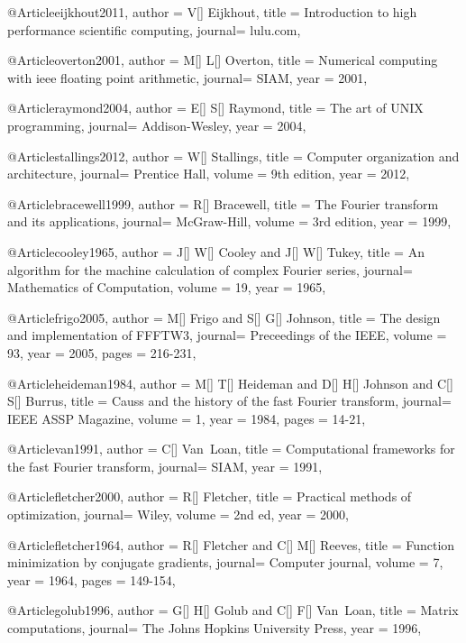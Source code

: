 {@Article{eijkhout2011,
  author = 	 {V[] Eijkhout},
  title  = 	 {Introduction to high performance scientific computing},
  journal= 	 {lulu.com},
}

@Article{overton2001,
  author = 	 {M[] L[] Overton},
  title  = 	 {Numerical computing with ieee floating point arithmetic},
  journal= 	 {SIAM},
  year   = 	 2001,
}

@Article{raymond2004,
  author = 	 {E[] S[] Raymond},
  title  = 	 {The art of UNIX programming},
  journal= 	 {Addison-Wesley},
  year   = 	 2004,
}

@Article{stallings2012,
  author = 	 {W[] Stallings},
  title  = 	 {Computer organization and architecture},
  journal= 	 {Prentice Hall},
  volume =	 {9th edition},
  year   = 	 2012,
}

@Article{bracewell1999,
  author = 	 {R[] Bracewell},
  title  = 	 {The Fourier transform and its applications},
  journal= 	 {McGraw-Hill},
  volume =	 {3rd edition},
  year   = 	 1999,
}

@Article{cooley1965,
  author = 	 {J[] W[] Cooley and J[] W[] Tukey},
  title  = 	 {An algorithm for the machine calculation of complex Fourier series},
  journal= 	 {Mathematics of Computation},
  volume =	 {19},
  year   = 	 1965,
}

@Article{frigo2005,
  author = 	 {M[] Frigo and S[] G[] Johnson},
  title  = 	 {The design and implementation of FFFTW3},
  journal= 	 {Preceedings of the IEEE},
  volume =	 {93},
  year   = 	 2005,
  pages = 216-231,
}

@Article{heideman1984,
  author = 	 {M[] T[] Heideman and D[] H[] Johnson and C[] S[] Burrus},
  title  = 	 {Causs and the history of the fast Fourier transform},
  journal= 	 {IEEE ASSP Magazine},
  volume =	 {1},
  year   = 	 1984,
  pages = 14-21,
}

@Article{van1991,
  author = 	 {C[] Van~Loan},
  title  = 	 {Computational frameworks for the fast Fourier transform},
  journal= 	 {SIAM},
  year   = 	 1991,
}

@Article{fletcher2000,
  author = 	 {R[] Fletcher},
  title  = 	 {Practical methods of optimization},
  journal= 	 {Wiley},
  volume =	 {2nd ed},
  year   = 	 2000,
}

@Article{fletcher1964,
  author = 	 {R[] Fletcher and C[] M[] Reeves},
  title  = 	 {Function minimization by conjugate gradients},
  journal= 	 {Computer journal},
  volume =	 {7},
  year   = 	 1964,
  pages = 149-154,
}

@Article{golub1996,
  author = 	 {G[] H[] Golub and C[] F[] Van~Loan},
  title  = 	 {Matrix computations},
  journal= 	 {The Johns Hopkins University Press},
  year   = 	 1996,
}

}
